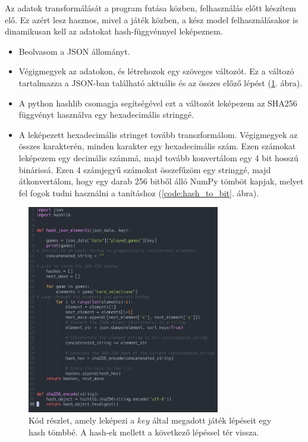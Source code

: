 Az adatok transformálását a program futása közben, felhasználás előtt készítem elő. Ez azért lesz hasznos, mivel a játék közben, a kész model felhasználásakor is dinamikusan kell az adatokat hash-függvénnyel leképeznem.

\begin{itemize}
    \item Beolvasom a JSON állományt. 
    \item Végigmegyek az adatokon, és létrehozok egy szöveges változót. Ez a változó tartalmazza a JSON-ban található aktuális és az összes előző lépést  (\ref{code:json_to_hash}. ábra). 
    \item A python hashlib csomagja segítségével ezt a változót leképezem az SHA256 függvényt használva egy hexadecimális stringgé. 
    \item A leképezett hexadecimális stringet tovább transzformálom. 
    Végigmegyek az összes karakterén, minden karakter egy hexadecimális szám. Ezen számokat leképezem egy decimális számmá, majd tovább konvertálom egy 4 bit hosszú binárissá. Ezen 4 számjegyű számokat összefűzöm egy stringgé, majd átkonvertálom, hogy egy darab 256 bitből álló NumPy tömböt kapjak, melyet fel fogok tudni használni a tanításhoz (\ref{code:hash_to_bit}. ábra). 
\end{itemize}

\begin{figure}[h]
    \includegraphics[width=0.75\textwidth]{img/JSON_TO_SHA256.png}
    \caption{Kód részlet, amely leképezi a $key$ által megadott játék lépéseit egy hash tömbbé. A hash-ek mellett a következő lépéssel tér vissza.}
    \label{code:json_to_hash}
\end{figure}

